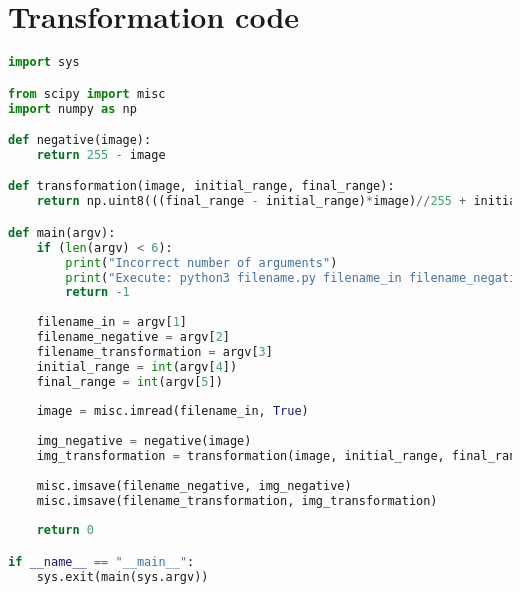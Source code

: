 \documentclass[journal]{IEEEtran}
\begin{document}
\section{Transformation code}
\begin{lstlisting}[language=Python, caption=Transformation code, label=list:transformation_code]
import sys

from scipy import misc
import numpy as np

def negative(image):
	return 255 - image

def transformation(image, initial_range, final_range):
    return np.uint8(((final_range - initial_range)*image)//255 + initial_range)

def main(argv):
	if (len(argv) < 6):
		print("Incorrect number of arguments")
		print("Execute: python3 filename.py filename_in filename_negative filename_transformation initial_range final_range")
		return -1
		
	filename_in = argv[1]
	filename_negative = argv[2]
	filename_transformation = argv[3]
	initial_range = int(argv[4])
	final_range = int(argv[5])
	
	image = misc.imread(filename_in, True)
	
	img_negative = negative(image)
	img_transformation = transformation(image, initial_range, final_range)
	
	misc.imsave(filename_negative, img_negative)
	misc.imsave(filename_transformation, img_transformation)
	
	return 0

if __name__ == "__main__":
	sys.exit(main(sys.argv))
\end{lstlisting}
\end{document}
